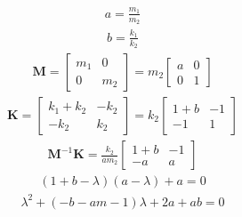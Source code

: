 \documentclass[letterpaper,10pt,english]{sphinxmanual}
\let\sphinxpxdimen\pdfpxdimen\else\newdimen\sphinxpxdimen
\begin{document}
\sphinxAtStartPar
\sphinxincludegraphics[width=3699\sphinxpxdimen,height=1192\sphinxpxdimen]{{2dof}.png}
\begin{equation*}
\begin{split}a = \frac{m_{1}}{m_{2}}\end{split}
\end{equation*}\begin{equation*}
\begin{split}b = \frac{k_{1}}{k_{2}}\end{split}
\end{equation*}\begin{equation*}
\begin{split}\mathbf{M} = \begin{bmatrix} m_{1} & 0 \\ 0 & m_{2} \end{bmatrix} = m_{2}\begin{bmatrix} a & 0 \\ 0 & 1 \end{bmatrix}\end{split}
\end{equation*}\begin{equation*}
\begin{split}\mathbf{K} = \begin{bmatrix} k_{1}+k_{2} & -k_{2} \\ -k_{2} & k_{2} \end{bmatrix} = k_{2} \begin{bmatrix} 1+b & -1 \\ -1 & 1 \end{bmatrix}\end{split}
\end{equation*}\begin{equation*}
\begin{split}\mathbf{M}^{-1}\mathbf{K} = \frac{k_{2}}{am_{2}}\begin{bmatrix} 1+b & -1 \\ -a & a \end{bmatrix}\end{split}
\end{equation*}\begin{equation*}
\begin{split}(1+b-\lambda)(a-\lambda)+a = 0\end{split}
\end{equation*}\begin{equation*}
\begin{split}\lambda^{2}+(-b-a{m}-1)\lambda+2a+ab = 0\end{split}

\end{equation*}
\end{document}
